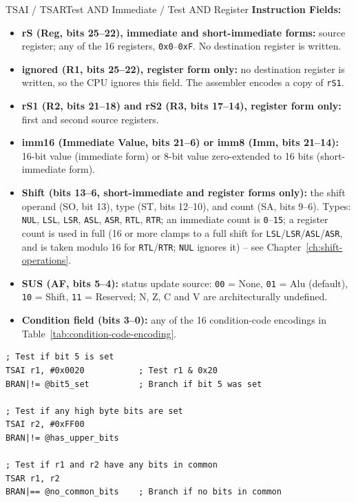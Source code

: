 \begin{instructionbox}{TSAI / TSAR}{Test AND Immediate / Test AND Register}
	\textbf{Instruction Fields:}
	\begin{itemize}
		\item \textbf{rS (Reg, bits 25--22), immediate and short-immediate forms:} source register; any of the 16 registers,
		      \texttt{0x0}--\texttt{0xF}. No destination register is written.
		\item \textbf{ignored (R1, bits 25--22), register form only:} no destination register is written, so the CPU ignores
		      this field. The assembler encodes a copy of \texttt{rS1}.
		\item \textbf{rS1 (R2, bits 21--18) and rS2 (R3, bits 17--14), register form only:} first and second source registers.
		\item \textbf{imm16 (Immediate Value, bits 21--6) or imm8 (Imm, bits 21--14):} 16-bit value (immediate form) or 8-bit
		      value zero-extended to 16 bits (short-immediate form).
		\item \textbf{Shift (bits 13--6, short-immediate and register forms only):} the shift operand (SO, bit 13), type (ST, bits 12--10), and count (SA, bits 9--6). Types:
		      \texttt{NUL}, \texttt{LSL},
		      \texttt{LSR}, \texttt{ASL}, \texttt{ASR}, \texttt{RTL}, \texttt{RTR}; an immediate count is
		      \texttt{0}--\texttt{15}; a register count is used in full (16 or more clamps to a full shift for \texttt{LSL}/\texttt{LSR}/\texttt{ASL}/\texttt{ASR}, and is taken modulo 16 for \texttt{RTL}/\texttt{RTR}; \texttt{NUL} ignores it) -- see Chapter~\ref{ch:shift-operations}.
		\item \textbf{SUS (AF, bits 5--4):} status update source: \texttt{00} = None, \texttt{01} = Alu (default), \texttt{10} = Shift, \texttt{11} =
		      Reserved; N, Z, C and V are architecturally undefined.
		\item \textbf{Condition field (bits 3--0):} any of the 16 condition-code encodings in
		      Table~\ref{tab:condition-code-encoding}.
	\end{itemize}

	\begin{example}
		\begin{lstlisting}
; Test if bit 5 is set
TSAI r1, #0x0020           ; Test r1 & 0x20
BRAN|!= @bit5_set          ; Branch if bit 5 was set

; Test if any high byte bits are set
TSAI r2, #0xFF00
BRAN|!= @has_upper_bits

; Test if r1 and r2 have any bits in common
TSAR r1, r2
BRAN|== @no_common_bits    ; Branch if no bits in common


\end{lstlisting}
\end{example}
\end{instructionbox}

